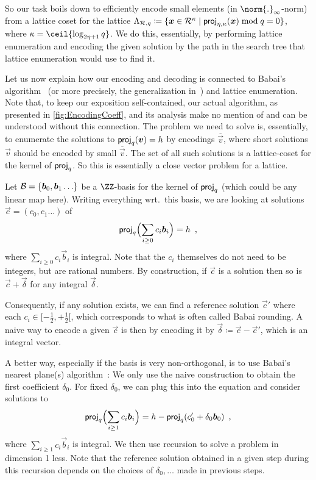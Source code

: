 So our task boils down to efficiently encode small elements (in $\norm{.}_{\infty}$-norm) from a lattice coset for the lattice $\Lambda_{\mathcal{R},q} \coloneqq \{\boldsymbol{x}\in\mathcal{R}^\kappa \mid \mathsf{proj}_{\eta,\kappa}(\boldsymbol{x})\bmod q = 0\}$, where $\limbs = \ceil{\log_{2\eta+1}q}$.
We do this, essentially, by performing lattice enumeration and encoding the given solution by the path in the search tree that lattice enumeration would use to find it.


\begin{remark}\label{rmk:RelationshipToBabai}
Let us now explain how our encoding and decoding is connected to Babai's algorithm~\cite{DBLP:journals/combinatorica/Babai86} (or more precisely, the generalization in~\cite{RSA:LinPei11}) and lattice enumeration.
Note that, to keep our exposition self-contained, our actual algorithm, as presented in \autoref{fig:EncodingCoeff}, and its analysis make no mention of and can be understood without this connection.
The problem we need to solve is, essentially, to enumerate the solutions to $\mathsf{proj}_q(\boldsymbol{v}) = h$ by encodings $\overline{\vec{v}}$, where short solutions $\vec{v}$ should be encoded by small $\overline{\vec{v}}$.
The set of all such solutions is a lattice-coset for the kernel of $\mathsf{proj}_q$. So this is essentially a close vector problem for a lattice.

Let $\mathcal{B} = \{\boldsymbol{b}_0,\boldsymbol{b}_1\ldots\}$ be a $\ZZ$-basis for the kernel of $\mathsf{proj}_q$ (which could be any linear map here).
Writing everything wrt.\ this basis, we are looking at solutions $\vec{c} = (c_0,c_1\ldots)$ of
\[
\mathsf{proj}_q\Bigl(\sum_{i\geq 0} c_i\boldsymbol{b}_i\Bigr) = h\enspace,
\]
where $\sum_{i\geq 0} c_i\vec{b}_i$ is integral.
Note that the $c_i$ themselves do not need to be integers, but are rational numbers.
By construction, if $\vec{c}$ is a solution then so is $\vec{c} + \vec{\delta}$ for any integral $\vec{\delta}$.

Consequently, if any solution exists, we can find a reference solution $\vec{c}'$ where each $c_i\in [-\tfrac12,+\tfrac12[$, which corresponds to what is often called Babai rounding.
A naive way to encode a given $\vec{c}$ is then by encoding it by $\vec{\delta} \coloneqq \vec{c} - \vec{c}'$, which is an integral vector.

A better way, especially if the basis is very non-orthogonal, is to use Babai's nearest plane(s) algorithm~\cite{DBLP:journals/combinatorica/Babai86,RSA:LinPei11}:
We only use the naive construction to obtain the first coefficient $\delta_0$. For fixed $\delta_0$, we can plug this into the equation and consider solutions to
\[
\mathsf{proj}_q\Bigl(\sum_{i\geq 1} c_i\boldsymbol{b}_i\Bigr) = h - \mathsf{proj}_q(c'_0 + \delta_0\boldsymbol{b}_0)\enspace,
\]
where $\sum_{i\geq 1} c_i\vec{b}_i$ is integral. We then use recursion to solve a problem in dimension 1 less.
Note that the reference solution obtained in a given step during this recursion depends on the choices of $\delta_0,\ldots$ made in previous steps.


\end{remark}
